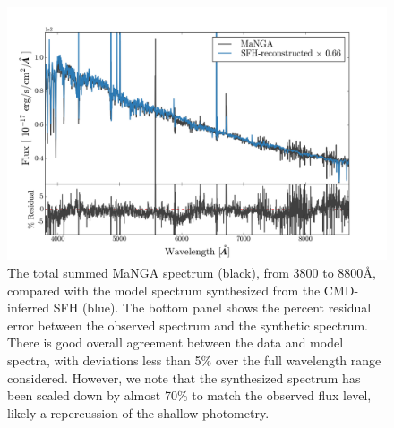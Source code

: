 \documentclass[preprint2]{aastex62}
\newcommand{\ang}{\ensuremath{\mbox{\AA}}\xspace}
\begin{document}
\begin{figure}
  \begin{center}
    \includegraphics[width=\linewidth]{figs/figA.png}
    \caption{The total summed MaNGA spectrum (black), from 3800 to 8800\ang, compared with the model spectrum synthesized from the CMD-inferred SFH (blue). The bottom panel shows the percent residual error between the observed spectrum and the synthetic spectrum. There is good overall agreement between the data and model spectra, with deviations less than 5\% over the full wavelength range considered. However, we note that the synthesized spectrum has been scaled down by almost 70\% to match the observed flux level, likely a repercussion of the shallow photometry.}
    \label{fig:fullSpec}
  \end{center}
\end{figure}
\end{document}
